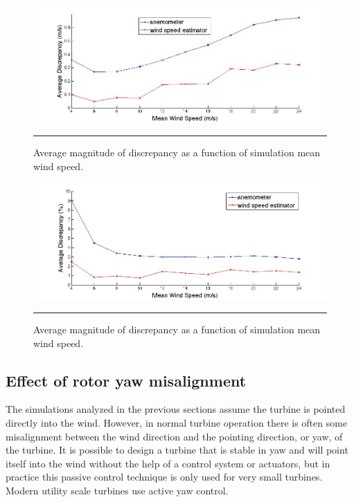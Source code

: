 \begin{figure}[htbp]
	\centering
		\includegraphics[trim = {3cm 0 2.5cm 0}, clip, width = \linewidth]{Figures/ch2Figures/fig2-18.jpg}
		\rule{35em}{0.5pt}
	\caption{Average magnitude of discrepancy as a function of simulation mean wind speed.}
	\label{fig2-18}
\end{figure}



\begin{figure}[htbp]
	\centering
		\includegraphics[trim = {3cm 0 2.5cm 0}, clip, width = \linewidth]{Figures/ch2Figures/fig2-19.jpg}
		\rule{35em}{0.5pt}
	\caption{Average magnitude of discrepancy as a function of simulation mean wind speed.}
	\label{fig2-19}
\end{figure}


\subsection{Effect of rotor yaw misalignment}

The simulations analyzed in the previous sections assume the turbine is pointed directly into the wind. However, in normal turbine operation there is often some misalignment between the wind direction and the pointing direction, or yaw, of the turbine. It is possible to design a turbine that is stable in yaw and will point itself into the wind without the help of a control system or actuators, but in practice this passive control technique is only used for very small turbines. Modern utility scale turbines use active yaw control\cite{burton2011}.

